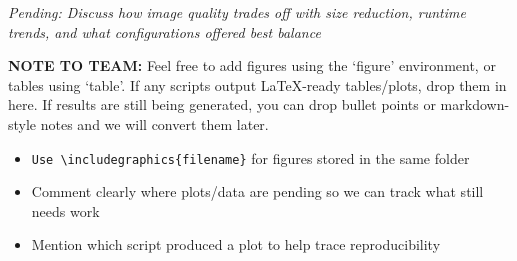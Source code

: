\textit{Pending: Discuss how image quality trades off with size reduction, runtime trends, and what configurations offered best balance}

\textbf{NOTE TO TEAM:} Feel free to add figures using the `figure' environment, or tables using `table'. If any scripts output LaTeX-ready tables/plots, drop them in here. If results are still being generated, you can drop bullet points or markdown-style notes and we will convert them later.

\begin{itemize}
    \item \texttt{Use \textbackslash includegraphics\{filename\}} for figures stored in the same folder
    \item Comment clearly where plots/data are pending so we can track what still needs work
    \item Mention which script produced a plot to help trace reproducibility
\end{itemize}